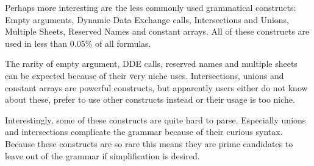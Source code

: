 Perhaps more interesting are the less commonly used grammatical constructs: Empty arguments, Dynamic Data Exchange calls, Intersections and Unions, Multiple Sheets, Reserved Names and constant arrays.
All of these constructs are used in less than 0.05\% of all formulas.

The rarity of empty argument, DDE calls, reserved names and multiple sheets can be expected because of their very niche uses.
Intersections, unions and constant arrays are powerful constructs, but apparently users either do not know about these, prefer to use other constructs instead or their usage is too niche.

Interestingly, some of these constructs are quite hard to parse.
Especially unions and intersections complicate the grammar because of their curious syntax.
Because these constructs are so rare this means they are prime candidates to leave out of the grammar if simplification is desired.